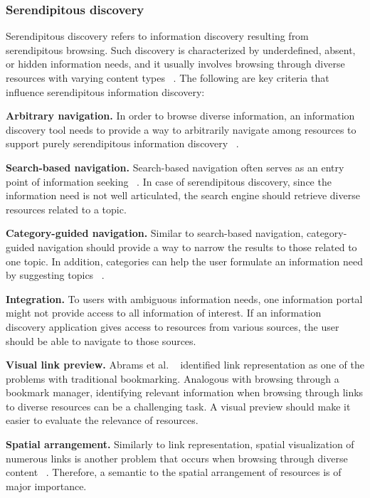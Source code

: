\documentclass{casconpaper}
\begin{document}
{\subsubsection{Serendipitous discovery}
Serendipitous discovery refers to information discovery resulting from serendipitous  browsing. Such discovery is characterized by underdefined, absent, or hidden information needs, and it usually involves browsing through diverse resources with varying content types ~\cite{kellar2006, kellar2007}. The following are key criteria that influence serendipitous information discovery:

\textbf{Arbitrary navigation.} In order to browse diverse information, an information discovery tool needs to provide a way to arbitrarily navigate among resources to support purely serendipitous information discovery ~\cite{foster}.

\textbf{Search-based navigation.} Search-based navigation often serves as an entry point of information seeking ~\cite{levene}. In case of serendipitous discovery, since the information need is not well articulated, the search engine should retrieve diverse resources related to a topic.

\textbf{Category-guided navigation.} Similar to search-based navigation, category-guided navigation should provide a way to narrow the results to those related to one topic. In addition, categories can help the user formulate an information need by suggesting topics ~\cite{levene}.

\textbf{Integration.} To users with ambiguous information needs, one information portal might not provide access to all information of interest. If an information discovery application gives access to resources from various sources, the user should be able to navigate to those sources.

\textbf{Visual link preview.} Abrams et al. ~\cite{abrams} identified link representation as one of the problems with traditional bookmarking. Analogous with browsing through a bookmark manager, identifying relevant information when browsing through links to diverse resources can be a challenging task. A visual preview should make it easier to evaluate the relevance of resources.

\textbf{Spatial arrangement.} Similarly to link representation, spatial visualization of numerous links is another problem that occurs when browsing through diverse content ~\cite{abrams}. Therefore, a semantic to the spatial arrangement of resources is of major importance.



} %
\end{document}
